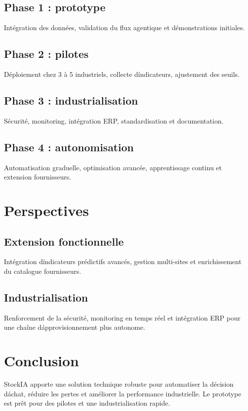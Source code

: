 \documentclass[12pt,a4paper]{report}
\begin{document}
\section{Phase 1 : prototype}
Int\'egration des donn\'ees, validation du flux agentique et d\'emonstrations initiales.

\section{Phase 2 : pilotes}
D\'eploiement chez 3 \`a 5 industriels, collecte d\'indicateurs, ajustement des seuils.

\section{Phase 3 : industrialisation}
S\'ecurit\'e, monitoring, int\'egration ERP, standardisation et documentation.

\section{Phase 4 : autonomisation}
Automatisation graduelle, optimisation avanc\'ee, apprentissage continu et extension fournisseurs.

\cleardoublepage

\chapter{Perspectives}
\section{Extension fonctionnelle}
Int\'egration d\'indicateurs pr\'edictifs avanc\'es, gestion multi-sites et enrichissement du catalogue fournisseurs.

\section{Industrialisation}
Renforcement de la s\'ecurit\'e, monitoring en temps r\'eel et int\'egration ERP pour une cha\^ine d\'approvisionnement plus autonome.

\cleardoublepage

\chapter{Conclusion}
StockIA apporte une solution technique robuste pour automatiser la d\'ecision d\'achat, r\'eduire les pertes et am\'eliorer la performance industrielle. Le prototype est pr\^et pour des pilotes et une industrialisation rapide.
\end{document}
